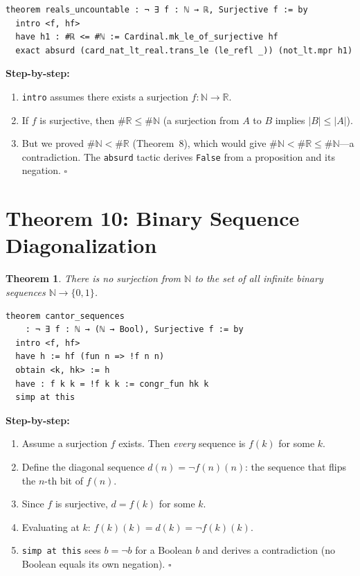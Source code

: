 \documentclass[11pt]{article}
\theoremstyle{plain}
\newtheorem{theorem}{Theorem}[section]
\theoremstyle{definition}
\begin{document}
\begin{lstlisting}
theorem reals_uncountable : ¬ ∃ f : ℕ → ℝ, Surjective f := by
  intro <f, hf>
  have h1 : #ℝ <= #ℕ := Cardinal.mk_le_of_surjective hf
  exact absurd (card_nat_lt_real.trans_le (le_refl _)) (not_lt.mpr h1)
\end{lstlisting}

\textbf{Step-by-step:}
\begin{enumerate}
  \item \texttt{intro} assumes there exists a surjection $f\colon\mathbb{N}\to\mathbb{R}$.
  \item If $f$ is surjective, then $\#\mathbb{R} \leq \#\mathbb{N}$ (a surjection
        from $A$ to $B$ implies $|B| \leq |A|$).
  \item But we proved $\#\mathbb{N} < \#\mathbb{R}$ (Theorem~8), which would give
        $\#\mathbb{N} < \#\mathbb{R} \leq \#\mathbb{N}$---a contradiction.
        The \texttt{absurd} tactic derives \texttt{False} from a proposition
        and its negation. $\square$
\end{enumerate}

\section{Theorem 10: Binary Sequence Diagonalization}

\begin{theorem}
There is no surjection from $\mathbb{N}$ to the set of all infinite binary
sequences $\mathbb{N} \to \{0,1\}$.
\end{theorem}

\begin{lstlisting}
theorem cantor_sequences
    : ¬ ∃ f : ℕ → (ℕ → Bool), Surjective f := by
  intro <f, hf>
  have h := hf (fun n => !f n n)
  obtain <k, hk> := h
  have : f k k = !f k k := congr_fun hk k
  simp at this
\end{lstlisting}

\textbf{Step-by-step:}
\begin{enumerate}
  \item Assume a surjection $f$ exists. Then \emph{every} sequence is $f(k)$ for
        some $k$.
  \item Define the diagonal sequence $d(n) = \neg f(n)(n)$: the sequence that
        flips the $n$-th bit of $f(n)$.
  \item Since $f$ is surjective, $d = f(k)$ for some $k$.
  \item Evaluating at $k$: $f(k)(k) = d(k) = \neg f(k)(k)$.
  \item \texttt{simp at this} sees $b = \neg b$ for a Boolean $b$ and derives a
        contradiction (no Boolean equals its own negation). $\square$
\end{enumerate}
\end{document}
